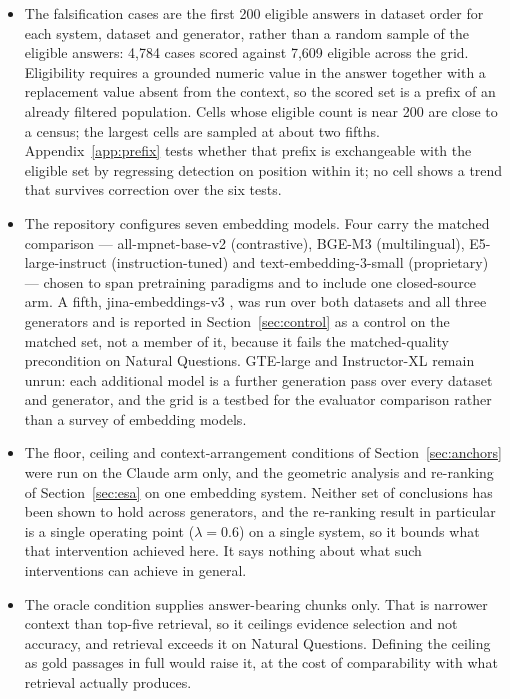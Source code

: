 \documentclass[11pt]{article}
\begin{document}
\begin{itemize}
\item The falsification cases are the first 200 eligible answers in dataset order for each system, dataset and generator, rather than a random sample of the eligible answers: 4,784 cases scored against 7,609 eligible across the grid. Eligibility requires a grounded numeric value in the answer together with a replacement value absent from the context, so the scored set is a prefix of an already filtered population. Cells whose eligible count is near 200 are close to a census; the largest cells are sampled at about two fifths. Appendix~\ref{app:prefix} tests whether that prefix is exchangeable with the eligible set by regressing detection on position within it; no cell shows a trend that survives correction over the six tests.
\item The repository configures seven embedding models. Four carry the matched comparison --- all-mpnet-base-v2 (contrastive), BGE-M3 (multilingual), E5-large-instruct (instruction-tuned) and text-embedding-3-small (proprietary) --- chosen to span pretraining paradigms and to include one closed-source arm. A fifth, jina-embeddings-v3 \citep{sturua-etal-2024}, was run over both datasets and all three generators and is reported in Section~\ref{sec:control} as a control on the matched set, not a member of it, because it fails the matched-quality precondition on Natural Questions. GTE-large and Instructor-XL remain unrun: each additional model is a further generation pass over every dataset and generator, and the grid is a testbed for the evaluator comparison rather than a survey of embedding models.

\item The floor, ceiling and context-arrangement conditions of Section~\ref{sec:anchors} were run on the Claude arm only, and the geometric analysis and re-ranking of Section~\ref{sec:esa} on one embedding system. Neither set of conclusions has been shown to hold across generators, and the re-ranking result in particular is a single operating point ($\lambda = 0.6$) on a single system, so it bounds what that intervention achieved here. It says nothing about what such interventions can achieve in general.

\item The oracle condition supplies answer-bearing chunks only. That is narrower context than top-five retrieval, so it ceilings evidence selection and not accuracy, and retrieval exceeds it on Natural Questions. Defining the ceiling as gold passages in full would raise it, at the cost of comparability with what retrieval actually produces.


\end{itemize}
\end{document}
